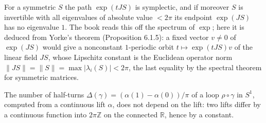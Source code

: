 \begin{lemma}
  \label{lem:7.1.2}
  \leanok
  For a symmetric $S$ the path $\exp(tJS)$ is symplectic, and if moreover $S$ is
  invertible with all eigenvalues of absolute value $< 2\pi$ its endpoint
  $\exp(JS)$ has no eigenvalue $1$.  The book reads this off the spectrum of
  $\exp$; here it is deduced from Yorke's theorem (Proposition 6.1.5): a fixed
  vector $v \ne 0$ of $\exp(JS)$ would give a nonconstant $1$-periodic orbit
  $t \mapsto \exp(tJS)v$ of the linear field $JS$, whose Lipschitz constant is the
  Euclidean operator norm $\lVert JS\rVert = \lVert S\rVert = \max|\lambda_i(S)| <
  2\pi$, the last equality by the spectral theorem for symmetric matrices.

  The number of half-turns $\Delta(\gamma) = (\alpha(1)-\alpha(0))/\pi$ of a loop
  $\rho\circ\gamma$ in $S^1$, computed from a continuous lift $\alpha$, does not
  depend on the lift: two lifts differ by a continuous function into $2\pi\mathbb{Z}$
  on the connected $\mathbb{R}$, hence by a constant.
\end{lemma}

